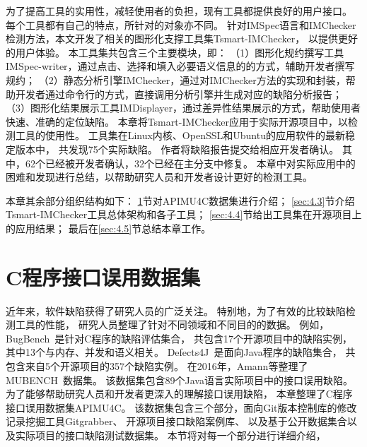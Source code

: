 为了提高工具的实用性，减轻使用者的负担，现有工具都提供良好的用户接口。
每个工具都有自己的特点，所针对的对象亦不同。
针对IMSpec语言和IMChecker检测方法，本文开发了相关的图形化支撑工具集Tsmart-IMChecker，
以提供更好的用户体验。
本工具集共包含三个主要模块，即：
（1）图形化规约撰写工具IMSpec-writer，通过点击、选择和填入必要语义信息的的方式，辅助开发者撰写规约；
（2）静态分析引擎IMChecker，通过对IMChecker方法的实现和封装，帮助开发者通过命令行的方式，直接调用分析引擎并生成对应的缺陷分析报告；
（3）图形化结果展示工具IMDisplayer，通过差异性结果展示的方式，帮助使用者快速、准确的定位缺陷。
本章将Tsmart-IMChecker应用于实际开源项目中，以检测工具的使用性。
工具集在Linux内核、OpenSSL和Ubuntu的应用软件的最新稳定版本中，
共发现75个实际缺陷。
作者将缺陷报告提交给相应开发者确认。
其中，62个已经被开发者确认，32个已经在主分支中修复。
本章中对实际应用中的困难和发现进行总结，以帮助研究人员和开发者设计更好的检测工具。



本章其余部分组织结构如下：
\ref{sec:4.2}节对APIMU4C数据集进行介绍；
\ref{sec:4.3}节介绍Tsmart-IMChecker工具总体架构和各子工具；
\ref{sec:4.4}节给出工具集在开源项目上的应用结果；
最后在\ref{sec:4.5}节总结本章工作。

\section{C程序接口误用数据集}
\label{sec:4.2}
近年来，软件缺陷获得了研究人员的广泛关注。
特别地，为了有效的比较缺陷检测工具的性能，
研究人员整理了针对不同领域和不同目的的数据。
例如，BugBench~\cite{05-bugbench}是针对C程序的缺陷评估集合，
共包含17个开源项目中的缺陷实例，
其中13个与内存、并发和语义相关。
Defects4J~\cite{14-issta-defects4j}是面向Java程序的缺陷集合，
共包含来自5个开源项目的357个缺陷实例。
在2016年，Amann等整理了MUBENCH~\cite{16-msr-mubench}数据集。
该数据集包含89个Java语言实际项目中的接口误用缺陷。
为了能够帮助研究人员和开发者更深入的理解接口误用缺陷，
本章整理了C程序接口误用数据集APIMU4C。
该数据集包含三个部分，面向Git版本控制库的修改记录挖掘工具Gitgrabber、
开源项目接口缺陷案例库、
以及基于公开数据集合以及实际项目的接口缺陷测试数据集。
本节将对每一个部分进行详细介绍，

